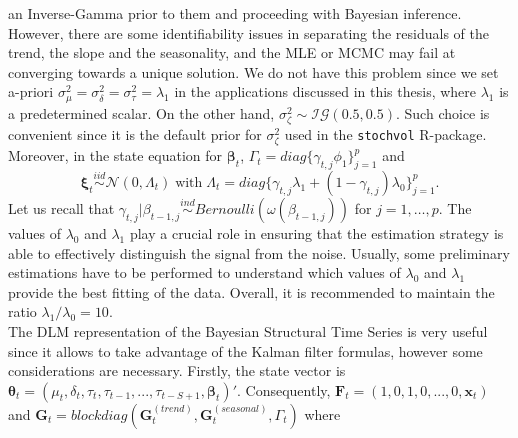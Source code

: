 \documentclass[
  12pt,
]{book}
\theoremstyle{break}
\theoremstyle{nonumberplain}
\begin{document}
an Inverse-Gamma prior to them and proceeding with Bayesian inference.
However, there are some identifiability issues in separating the
residuals of the trend, the slope and the seasonality, and the MLE or
MCMC may fail at converging towards a unique solution. We do not have
this problem since we set a-priori
\(\sigma^{2}_{\mu}=\sigma^{2}_{\delta}=\sigma^{2}_{\tau}=\lambda_1\) in
the applications discussed in this thesis, where \(\lambda_1\) is a
predetermined scalar. On the other hand,
\(\sigma^{2}_{\zeta}\sim\mathcal{IG}(0.5,0.5)\). Such choice is
convenient since it is the default prior for \(\sigma^{2}_{\zeta}\) used
in the \texttt{stochvol} R-package. Moreover, in the state equation for
\(\boldsymbol{\beta}_t\),
\(\Gamma_t=diag\{\gamma_{t,j}\phi_{1}\}_{j=1}^{p}\) and
\[ \boldsymbol{\xi}_{t} \overset{iid}{\sim}\mathcal{N}(0,\Lambda_t)\; \mbox{with} \; \Lambda_{t}=diag\{\gamma_{t,j}\lambda_{1}+(1-\gamma_{t,j})\lambda_{0}\}_{j=1}^{p}. \]
Let us recall that
\(\gamma_{t,j}|\beta_{t-1,j}\overset{ind}{\sim}Bernoulli(\omega(\beta_{t-1,j}))\)
for \(j=1,\ldots,p\). The values of \(\lambda_{0}\) and \(\lambda_{1}\)
play a crucial role in ensuring that the estimation strategy is able to
effectively distinguish the signal from the noise. Usually, some
preliminary estimations have to be performed to understand which values
of \(\lambda_{0}\) and \(\lambda_{1}\) provide the best fitting of the
data. Overall, it is recommended to maintain the ratio
\(\lambda_1/\lambda_0=10\).\\
The DLM representation of the Bayesian Structural Time Series is very
useful since it allows to take advantage of the Kalman filter formulas,
however some considerations are necessary. Firstly, the state vector is
\(\boldsymbol{\theta}_{t}=(\mu_{t},\delta_{t},\tau_{t},\tau_{t-1},...,\tau_{t-S+1},\boldsymbol{\beta}_{t})'\).
Consequently, \(\boldsymbol{F}_{t}=(1,0,1,0,...,0,\boldsymbol{x}_{t})\)
and
\(\boldsymbol{G}_{t}=blockdiag(\boldsymbol{G}_{t}^{(trend)},\boldsymbol{G}_{t}^{(seasonal)},\Gamma_{t})\)
where
\end{document}
